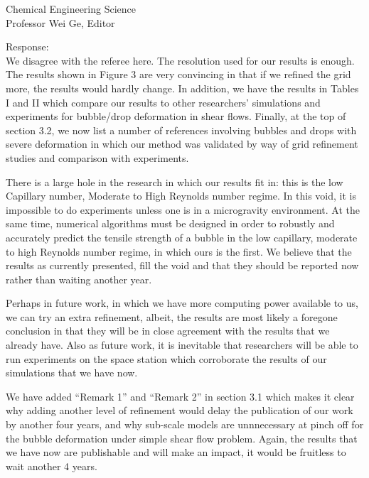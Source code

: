\documentclass{letter}
\begin{document}
\begin{letter}{
Chemical Engineering Science\\
Professor Wei Ge, Editor\\}
\begin{enumerate}
Response: \\
We disagree with the referee here.  The resolution used for our results is enough.  The results shown in Figure 3 are very convincing in that if we refined the grid more, the results would hardly change.  In addition, we have the results in Tables I and II which compare our results to other researchers' simulations and experiments for bubble/drop deformation in shear flows. Finally, at the top of section 3.2, we now list a number of references involving bubbles and drops with severe deformation in which our method was validated by way of grid refinement studies and comparison with experiments.  

There is a large hole in the research in which our results fit in: this is the low Capillary number, Moderate to High Reynolds number regime.  In this void, it is impossible to do experiments unless one is in a microgravity environment.  At the same time, numerical algorithms must be designed in order to robustly and accurately predict the tensile strength of a bubble in the low capillary, moderate to high Reynolds number regime, in which ours is the first.  We believe that the results as currently presented, fill the void and that they should be reported now rather than waiting another year.

Perhaps in future work, in which we have more computing power available to us, we can try an extra refinement, albeit, the results are most likely a foregone conclusion in that they will be in close agreement with the results that we already have.  Also as future work, it is inevitable that researchers will be able to run experiments on the space station which corroborate the results of our simulations that we have now.

We have added ``Remark 1'' and ``Remark 2'' in section 3.1 which makes it clear why adding another level of refinement would delay the publication of our work by another four years, and why sub-scale models are unnnecessary at pinch off for the bubble deformation under simple shear flow problem.  Again, the results that we have now are publishable and will make an impact, it would be fruitless to wait another 4 years.


\end{enumerate}
\end{letter}
\end{document}
